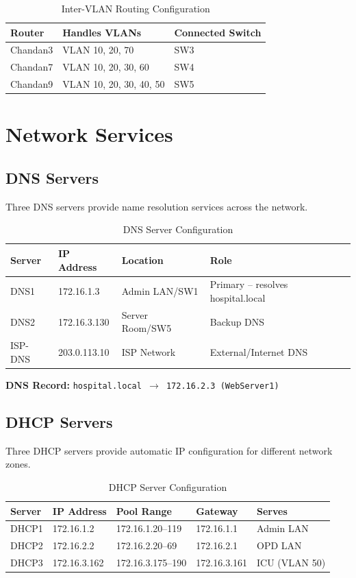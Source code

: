 \documentclass[12pt,a4paper]{report}
\begin{document}
\begin{table}[H]
\centering
\caption{Inter-VLAN Routing Configuration}
\begin{tabular}{lll}
\toprule
\textbf{Router} & \textbf{Handles VLANs} & \textbf{Connected Switch} \\
\midrule
Chandan3 & VLAN 10, 20, 70 & SW3 \\
Chandan7 & VLAN 10, 20, 30, 60 & SW4 \\
Chandan9 & VLAN 10, 20, 30, 40, 50 & SW5 \\
\bottomrule
\end{tabular}
\end{table}

\chapter{Network Services}

\section{DNS Servers}
Three DNS servers provide name resolution services across the network.

\begin{table}[H]
\centering
\caption{DNS Server Configuration}
\begin{tabular}{llll}
\toprule
\textbf{Server} & \textbf{IP Address} & \textbf{Location} & \textbf{Role} \\
\midrule
DNS1 & 172.16.1.3 & Admin LAN/SW1 & Primary -- resolves hospital.local \\
DNS2 & 172.16.3.130 & Server Room/SW5 & Backup DNS \\
ISP-DNS & 203.0.113.10 & ISP Network & External/Internet DNS \\
\bottomrule
\end{tabular}
\end{table}

\textbf{DNS Record:} \texttt{hospital.local $\rightarrow$ 172.16.2.3 (WebServer1)}

\section{DHCP Servers}
Three DHCP servers provide automatic IP configuration for different network zones.

\begin{table}[H]
\centering
\caption{DHCP Server Configuration}
\begin{tabular}{lllll}
\toprule
\textbf{Server} & \textbf{IP Address} & \textbf{Pool Range} & \textbf{Gateway} & \textbf{Serves} \\
\midrule
DHCP1 & 172.16.1.2 & 172.16.1.20--119 & 172.16.1.1 & Admin LAN \\
DHCP2 & 172.16.2.2 & 172.16.2.20--69 & 172.16.2.1 & OPD LAN \\
DHCP3 & 172.16.3.162 & 172.16.3.175--190 & 172.16.3.161 & ICU (VLAN 50) \\
\bottomrule
\end{tabular}
\end{table}
\end{document}
